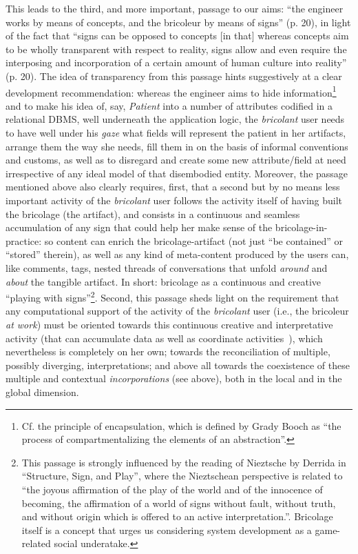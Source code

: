 \documentclass{article}
\begin{document}
This leads to the third, and more important, passage to our aims: ``the engineer works by means of concepts, and the bricoleur by means of signs''  (p. 20), in light of the fact that ``signs can be opposed to concepts [in that] whereas concepts aim to be wholly transparent with respect to reality, signs allow and even require the interposing and incorporation of a certain amount of human culture into reality'' (p. 20). 
The idea of transparency from this passage hints suggestively at a clear development recommendation: whereas the engineer aims to hide information\footnote{Cf. the principle of encapsulation, which is defined by Grady Booch as ``the process of compartmentalizing the elements of an abstraction''.} and to make his idea of, say, \emph{Patient} into a number of attributes codified in a relational DBMS, well underneath the application logic, the \emph{bricolant} user needs to have well under his \emph{gaze} what fields will represent the patient in her artifacts, arrange them the way she needs, fill them in on the basis of informal conventions and customs, as well as to disregard and create some new attribute/field at need irrespective of any ideal model of that disembodied entity.
Moreover, the passage mentioned above also clearly requires, first, that a second but by no means less important activity of the \emph{bricolant} user follows the activity itself of having built the bricolage (the artifact), and consists in a continuous and seamless accumulation of any sign that could help her make sense of the bricolage-in-practice: so content can enrich the bricolage-artifact (not just ``be contained'' or ``stored'' therein), as well as any kind of meta-content produced by the users can, like comments, tags, nested threads of conversations that unfold \emph{around} and \emph{about} the tangible artifact. In short: bricolage as a continuous and creative ``playing with signs''\footnote{This passage is strongly influenced by the reading of Nieztsche by Derrida in  ``Structure, Sign, and Play'', where the Nieztschean perspective is related to ``the joyous affirmation of the play of the world and of the innocence of becoming, the affirmation of a world of signs without fault, without truth, and without origin which is offered to an active interpretation.''. Bricolage itself is a concept that urges us considering system development as a game-related social underatake.}. Second, this passage sheds light on the requirement that any computational support of the activity of the \emph{bricolant} user (i.e., the bricoleur \emph{at work}) must be oriented towards this continuous creative and interpretative activity (that can accumulate data as well as coordinate activities~\citep{berg_accumulating_1999}), which nevertheless is completely on her own; towards the reconciliation of multiple, possibly diverging, interpretations; and above all towards the coexistence of these multiple and contextual \emph{incorporations} (see above), both in the local and in the global dimension.
\end{document}

